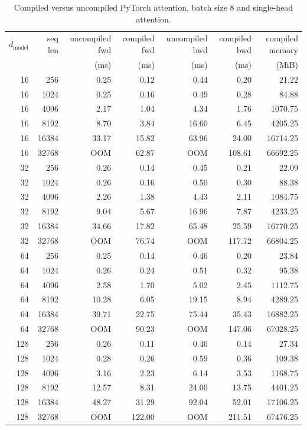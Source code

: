 \documentclass[11pt]{article}
\begin{document}
\begin{table}[H]
\centering
\scriptsize
\caption{Compiled versus uncompiled PyTorch attention, batch size 8 and single-head attention.}
\setlength{\tabcolsep}{2pt}
\begin{tabular}{rrrrrrr}
\toprule
$d_{\text{model}}$ & seq len & uncompiled fwd & compiled fwd & uncompiled bwd & compiled bwd & compiled memory \\
 &  & (ms) & (ms) & (ms) & (ms) & (MiB) \\
\midrule
16 & 256 & 0.25 & 0.12 & 0.44 & 0.20 & 21.22 \\
16 & 1024 & 0.25 & 0.16 & 0.49 & 0.28 & 84.88 \\
16 & 4096 & 2.17 & 1.04 & 4.34 & 1.76 & 1070.75 \\
16 & 8192 & 8.70 & 3.84 & 16.60 & 6.45 & 4205.25 \\
16 & 16384 & 33.17 & 15.82 & 63.96 & 24.00 & 16714.25 \\
16 & 32768 & OOM & 62.87 & OOM & 108.61 & 66692.25 \\
32 & 256 & 0.26 & 0.14 & 0.45 & 0.21 & 22.09 \\
32 & 1024 & 0.26 & 0.16 & 0.50 & 0.30 & 88.38 \\
32 & 4096 & 2.26 & 1.38 & 4.43 & 2.11 & 1084.75 \\
32 & 8192 & 9.04 & 5.67 & 16.96 & 7.87 & 4233.25 \\
32 & 16384 & 34.66 & 17.82 & 65.48 & 25.59 & 16770.25 \\
32 & 32768 & OOM & 76.74 & OOM & 117.72 & 66804.25 \\
64 & 256 & 0.25 & 0.14 & 0.46 & 0.20 & 23.84 \\
64 & 1024 & 0.26 & 0.24 & 0.51 & 0.32 & 95.38 \\
64 & 4096 & 2.58 & 1.70 & 5.02 & 2.45 & 1112.75 \\
64 & 8192 & 10.28 & 6.05 & 19.15 & 8.94 & 4289.25 \\
64 & 16384 & 39.71 & 22.75 & 75.44 & 35.43 & 16882.25 \\
64 & 32768 & OOM & 90.23 & OOM & 147.06 & 67028.25 \\
128 & 256 & 0.26 & 0.11 & 0.46 & 0.14 & 27.34 \\
128 & 1024 & 0.28 & 0.26 & 0.59 & 0.36 & 109.38 \\
128 & 4096 & 3.16 & 2.23 & 6.14 & 3.53 & 1168.75 \\
128 & 8192 & 12.57 & 8.31 & 24.00 & 13.75 & 4401.25 \\
128 & 16384 & 48.27 & 31.29 & 92.04 & 52.01 & 17106.25 \\
128 & 32768 & OOM & 122.00 & OOM & 211.51 & 67476.25 \\
\bottomrule
\end{tabular}
\end{table}
\end{document}
